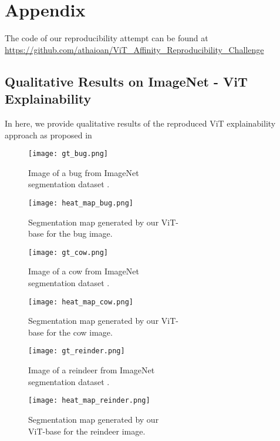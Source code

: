 \newpage
\section*{Appendix}
The code of our reproducibility attempt can be found at \url{https://github.com/athaioan/ViT_Affinity_Reproducibility_Challenge}

\subsection{Qualitative Results on ImageNet - ViT Explainability \cite{mainpaper}}
\label{ImageNet_results}
In here, we provide qualitative results of the reproduced ViT explainability approach as proposed in \cite{mainpaper}

\begin{figure}[H]
  \texttt{[image: gt\_bug.png]}
  \caption{Image of a bug from ImageNet \\segmentation dataset \cite{imagenet-seg}.}\label{fig:gt_bug}
\endminipage\hfill
{}
  \texttt{[image: heat\_map\_bug.png]}
  \caption{Segmentation map generated by our ViT- \\base for the bug image.}\label{fig:map_bug}
\endminipage\hfill
\end{figure}

\begin{figure}[H]
  \texttt{[image: gt\_cow.png]}
  \caption{Image of a cow from ImageNet \\segmentation dataset \cite{imagenet-seg}.}\label{fig:gt_cow}
\endminipage\hfill
{}
  \texttt{[image: heat\_map\_cow.png]}
  \caption{Segmentation map generated by our ViT- \\base for the cow image.}\label{fig:map_cow}
\endminipage\hfill
\end{figure}

\begin{figure}[H]
  \texttt{[image: gt\_reinder.png]}
  \caption{Image of a reindeer from ImageNet \\segmentation dataset \cite{imagenet-seg}.}\label{fig:gt_reinder}
\endminipage\hfill
{}
  \texttt{[image: heat\_map\_reinder.png]}
  \caption{Segmentation map generated by our \\ViT-base for the reindeer image.}\label{fig:map_reinder}
\endminipage\hfill
\end{figure}

